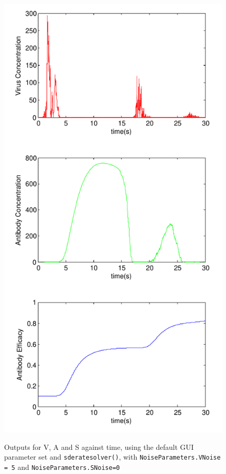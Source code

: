 \documentclass[a4paper, 12pt]{report}
\begin{document}
\begin{figure}
\begin{center}
\includegraphics[width=120mm]{Resurgance_scissored.pdf}
\label{resurgance}
\caption{Outputs for V, A and S against time, using the default GUI parameter set and \texttt{sderatesolver()}, with \texttt{NoiseParameters.VNoise = 5} and \texttt{NoiseParameters.SNoise=0}}
\end{center}
\end{figure}




\end{document}
